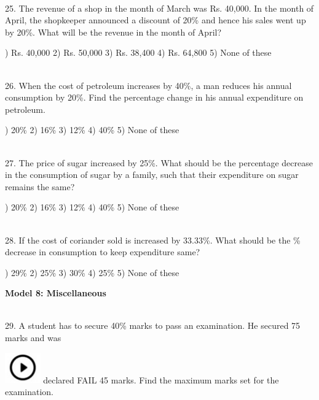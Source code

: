 \documentclass{article}
\begin{document}
\noindent 

\noindent 

\noindent 

\noindent \\ 25. The revenue of a shop in the month of March was Rs. 40,000. In the month of April, the shopkeeper announced a discount of 20\% and hence his sales went up by 20\%. What will be the revenue in the month of April?

) Rs. 40,000              2) Rs. 50,000       3) Rs. 38,400       4) Rs. 64,800       5) None of these

\noindent 

\noindent 

\noindent 

\noindent \\ 26. When the cost of petroleum increases by 40\%, a man reduces his annual consumption by 20\%. Find the percentage change in his annual expenditure on petroleum.

\noindent 

)  20\%                   2) 16\%              3) 12\%              4) 40\%              5) None of these

\noindent \\ 27. The price of sugar increased by 25\%. What should be the percentage decrease in the   consumption of sugar by a family, such that their expenditure on sugar remains the same?

) 20\%                    2) 16\%              3) 12\%              4) 40\%              5) None of these

\noindent 

\noindent 

\noindent 

\noindent \\ 28. If the cost of coriander sold is increased by 33.33\%. What should be the \% decrease in consumption to keep expenditure same?

) 29\%                    2) 25\%              3) 30\%              4) 25\%              5) None of these

\noindent 

\noindent \textbf{Model 8: Miscellaneous}

\noindent 

\noindent \\ 29. A student has to secure 40\% marks to pass an examination. He secured 75 marks and was

\noindent \includegraphics*[width=0.60in, height=0.52in]{images/image1} declared FAIL 45 marks. Find the maximum marks set for the examination.
\end{document}
